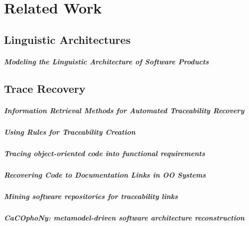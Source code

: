 \chapter{Related Work}
\label{chapter:RelatedWork}

\section{Linguistic Architectures}

\paragraph*{Modeling the Linguistic Architecture of Software Products}
\cite{DBLP:conf/models/FavreLV12}


\section{Trace Recovery}

\paragraph*{Information Retrieval Methods for Automated Traceability Recovery}
\cite{DeLucia2012}

\paragraph*{Using Rules for Traceability Creation} 
\cite{Zisman2012}

\paragraph*{Tracing object-oriented code into functional requirements} 
\cite{AntoniolCCDM00}

\paragraph*{Recovering Code to Documentation Links in OO Systems}
\cite{AntoniolCDLM99}

\paragraph*{Mining software repositories for traceability links}
\cite{KagdiMS07}

\paragraph*{CaCOphoNy: metamodel-driven software architecture reconstruction}
\cite{Favre2004}

